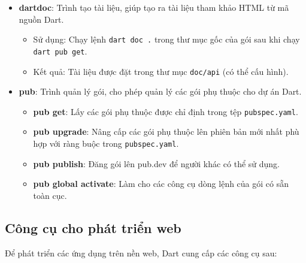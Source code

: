 \documentclass[../DoAn.tex]{subfiles}
\numberwithin{figure}{chapter}
\begin{document}
\begin{itemize}
    \item \textbf{dartdoc}: Trình tạo tài liệu, giúp tạo ra tài liệu tham khảo HTML từ mã nguồn Dart.
    \begin{itemize}
        \item Sử dụng: Chạy lệnh \texttt{dart doc .} trong thư mục gốc của gói sau khi chạy \texttt{dart pub get}.
        \item Kết quả: Tài liệu được đặt trong thư mục \texttt{doc/api} (có thể cấu hình).
    \end{itemize}
    \item \textbf{pub}: Trình quản lý gói, cho phép quản lý các gói phụ thuộc cho dự án Dart.
    \begin{itemize}
        \item \textbf{pub get}: Lấy các gói phụ thuộc được chỉ định trong tệp \texttt{pubspec.yaml}.
        \item \textbf{pub upgrade}: Nâng cấp các gói phụ thuộc lên phiên bản mới nhất phù hợp với ràng buộc trong \texttt{pubspec.yaml}.
        \item \textbf{pub publish}: Đăng gói lên pub.dev để người khác có thể sử dụng.
        \item \textbf{pub global activate}: Làm cho các công cụ dòng lệnh của gói có sẵn toàn cục.
    \end{itemize}
\end{itemize}

\subsection{Công cụ cho phát triển web}

Để phát triển các ứng dụng trên nền web, Dart cung cấp các công cụ sau:
\end{document}
